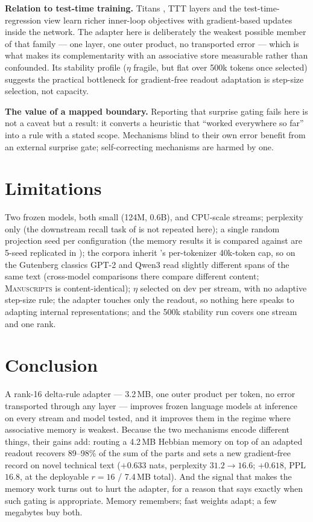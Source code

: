 \documentclass[11pt]{article}
\begin{document}
\textbf{Relation to test-time training.} Titans \cite{titans}, TTT layers \cite{ttt} and the test-time-regression view \cite{ttr} learn richer inner-loop objectives with gradient-based updates inside the network. The adapter here is deliberately the weakest possible member of that family --- one layer, one outer product, no transported error --- which is what makes its complementarity with an associative store measurable rather than confounded. Its stability profile ($\eta$ fragile, but flat over 500k tokens once selected) suggests the practical bottleneck for gradient-free readout adaptation is step-size selection, not capacity.

\textbf{The value of a mapped boundary.} Reporting that surprise gating fails here is not a caveat but a result: it converts a heuristic that ``worked everywhere so far'' into a rule with a stated scope. Mechanisms blind to their own error benefit from an external surprise gate; self-correcting mechanisms are harmed by one.

\section{Limitations}

Two frozen models, both small (124M, 0.6B), and CPU-scale streams; perplexity only (the downstream recall task of \cite{sillage} is not repeated here); a single random projection seed per configuration (the memory results it is compared against are 5-seed replicated in \cite{sillage,router}); the corpora inherit \cite{sillage}'s per-tokenizer 40k-token cap, so on the Gutenberg classics GPT-2 and Qwen3 read slightly different spans of the same text (cross-model comparisons there compare different content; \textsc{Manuscripts} is content-identical); $\eta$ selected on dev per stream, with no adaptive step-size rule; the adapter touches only the readout, so nothing here speaks to adapting internal representations; and the 500k stability run covers one stream and one rank.

\section{Conclusion}

A rank-16 delta-rule adapter --- 3.2\,MB, one outer product per token, no error transported through any layer --- improves frozen language models at inference on every stream and model tested, and it improves them in the regime where associative memory is weakest. Because the two mechanisms encode different things, their gains add: routing a 4.2\,MB Hebbian memory on top of an adapted readout recovers 89--98\% of the sum of the parts and sets a new gradient-free record on novel technical text ($+0.633$ nats, perplexity $31.2 \to 16.6$; $+0.618$, PPL $16.8$, at the deployable $r{=}16$ / 7.4\,MB total). And the signal that makes the memory work turns out to hurt the adapter, for a reason that says exactly when such gating is appropriate. Memory remembers; fast weights adapt; a few megabytes buy both.
\end{document}
